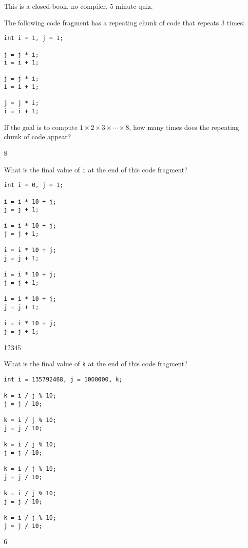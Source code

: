 

This is a closed-book, no compiler, 5 minute quiz.

\nextq
The following code fragment has a repeating chunk of code that repeats
3 times:
\begin{Verbatim}[fontsize=\footnotesize,frame=single,commandchars=\\\{\}]
int i = 1, j = 1;

j = j * i;
i = i + 1;

j = j * i;
i = i + 1;

j = j * i;
i = i + 1;
\end{Verbatim}
If the goal is to compute $1 \times 2 \times 3 \times \cdots \times 8$,
how many times does the repeating chunk of code appear?
\\
\ANSWER
\begin{answercode}
8
\end{answercode}

\nextq
What is the final value of \verb!i! at the end of this code fragment?
\begin{Verbatim}[fontsize=\footnotesize,frame=single]
int i = 0, j = 1;

i = i * 10 + j;
j = j + 1;

i = i * 10 + j;
j = j + 1;

i = i * 10 + j;
j = j + 1;

i = i * 10 + j;
j = j + 1;

i = i * 10 + j;
j = j + 1;

i = i * 10 + j;
j = j + 1;
\end{Verbatim}
\ANSWER
\begin{answercode}
12345
\end{answercode}

\nextq
What is the final value of \verb!k! at the end of this code fragment?
\begin{Verbatim}[fontsize=\footnotesize,frame=single]
int i = 135792468, j = 1000000, k;

k = i / j % 10;
j = j / 10;

k = i / j % 10;
j = j / 10;

k = i / j % 10;
j = j / 10;

k = i / j % 10;
j = j / 10;

k = i / j % 10;
j = j / 10;

k = i / j % 10;
j = j / 10;
\end{Verbatim}
\ANSWER
\begin{answercode}
6
\end{answercode}


